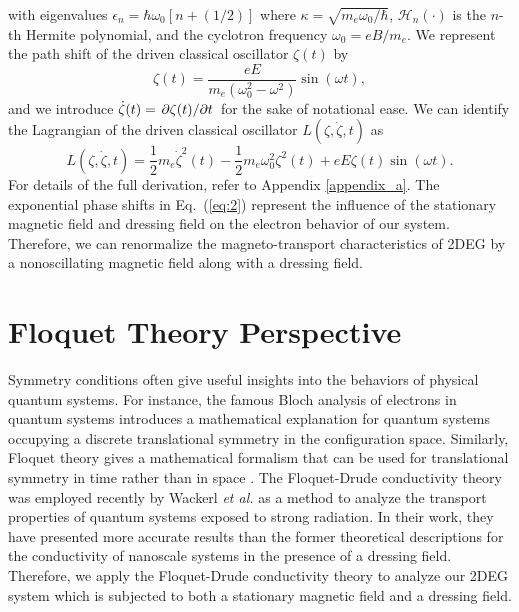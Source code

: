 \documentclass[
 reprint,
 amsmath,amssymb,
 aps,
 prb,
]{revtex4-2}
\begin{document}
with eigenvalues $\epsilon_n = \hbar \omega_0 [n + (1/2)]$ where $\kappa = \sqrt{{m_e \omega_0}/{\hbar}}$, $\mathcal{H}_n(\cdot)$ is the $n$-th Hermite polynomial, and the cyclotron frequency $\omega_0 = eB/m_e$.
We represent the path shift of the driven classical oscillator $\zeta(t)$ by
\begin{equation} \label{eq:4}
  \zeta(t) = \frac{eE}{m_e(\omega_0^2 - \omega^2)}\sin(\omega t),
\end{equation}
and we introduce $\dot{\zeta}(t) = \pdv*{\zeta(t)}{t}$ for the sake of notational ease. We can identify the Lagrangian of the driven classical oscillator $L(\zeta,\dot{\zeta},t)$ as
\begin{equation} \label{eq:5}
  L(\zeta,\dot{\zeta},t) = \frac{1}{2} m_e\dot{\zeta}^2(t) - \frac{1}{2}m_e\omega_0^2 \zeta^2(t) + eE\zeta(t) \sin(\omega t).
\end{equation}
For details of the full derivation, refer to Appendix \ref{appendix_a}.
The exponential phase shifts in Eq.~(\ref{eq:2}) represent the influence of the stationary magnetic field and dressing field on the electron behavior of our system. Therefore, we can renormalize the magneto-transport characteristics of 2DEG by a nonoscillating magnetic field along with a dressing field.

\section{\label{sec_floquet_theory} Floquet Theory Perspective}

Symmetry conditions often give useful insights into the behaviors of physical quantum systems.
For instance, the famous Bloch analysis of electrons in quantum systems introduces a mathematical explanation for quantum systems occupying a discrete translational symmetry in the configuration space. Similarly, Floquet theory gives a mathematical formalism that can be used for translational symmetry in time rather than in space \cite{floquet83,grifoni98,holthaus15}.
The Floquet-Drude conductivity theory was employed recently by Wackerl \textit{et al.} \cite{wackerl20} as a method to analyze the transport properties of quantum systems exposed to strong radiation.
In their work, they have presented more accurate results than the former theoretical descriptions for the conductivity of nanoscale systems in the  presence of a dressing field. Therefore, we apply the Floquet-Drude conductivity theory to analyze our 2DEG system which is subjected to both a stationary magnetic field and a dressing field.
\end{document}
